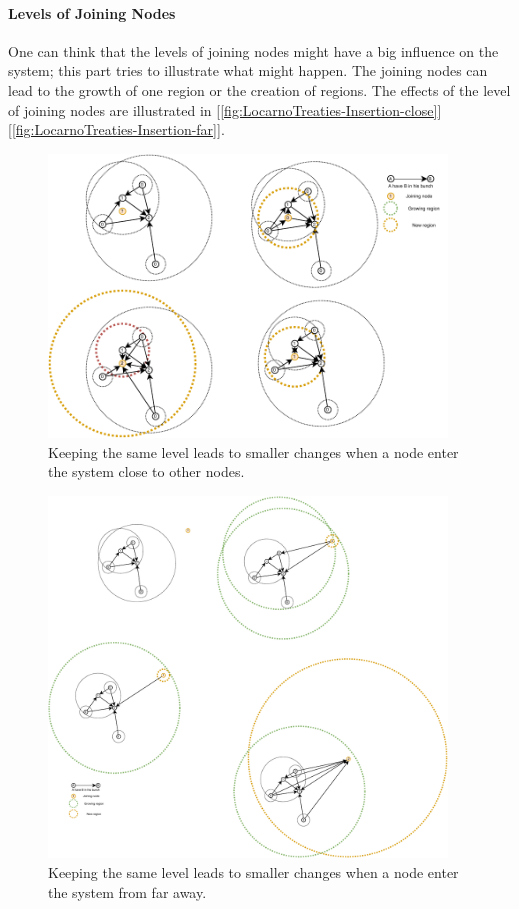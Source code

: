 \documentclass[a4paper,11pt,twoside=semi,openright]{report}
\begin{document}
\paragraph{Levels of Joining Nodes}
One can think that the levels of joining nodes might have a big influence on the
system; this part tries to illustrate what might happen. The joining nodes can
lead to the growth of one region or the creation
of regions. The effects of the level of joining nodes are illustrated in
[\autoref{fig:LocarnoTreaties-Insertion-close}][\autoref{fig:LocarnoTreaties-Insertion-far}].

\begin{figure}[!h] 
\centering
\includegraphics[width=300pt]{figures/LocarnoTreaties-Insertion-close}
\caption{Keeping the same level leads to smaller changes when a node enter the
 system close to other nodes. } \label{fig:LocarnoTreaties-Insertion-close}
\end{figure}

\begin{figure}[!h] 
\centering
\includegraphics[width=300pt]{figures/LocarnoTreaties-Insertion-far}
\caption{Keeping the same level leads to smaller changes when a node enter the
 system from far away. } \label{fig:LocarnoTreaties-Insertion-far}
\end{figure}
\end{document}
